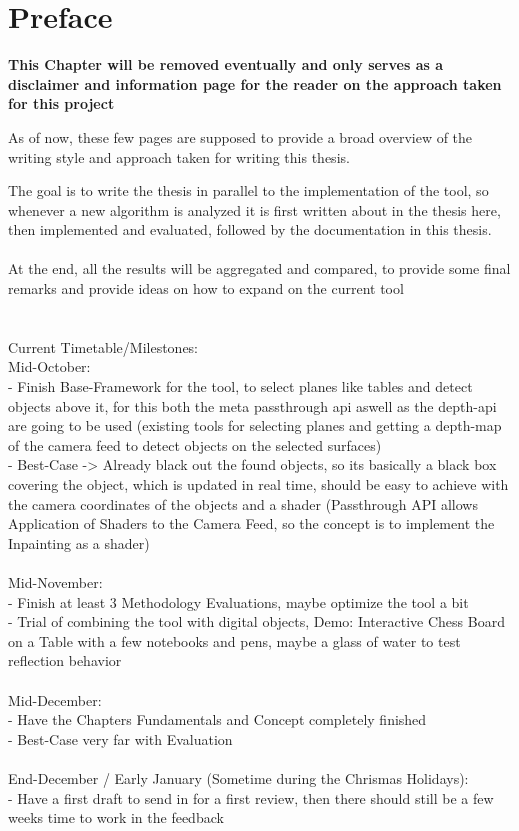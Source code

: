 \chapter{Preface}
\textbf{This Chapter will be removed eventually and only serves as a disclaimer and information page for the reader on the approach taken for this project}

As of now, these few pages are supposed to provide a broad overview of the writing style and approach taken for writing this thesis.

The goal is to write the thesis in parallel to the implementation of the tool, so whenever a new algorithm is analyzed it is first written about in the thesis here, then implemented and evaluated, followed by the documentation in this thesis.
\\\\
At the end, all the results will be aggregated and compared, to provide some final remarks and provide ideas on how to expand on the current tool
\\\\\\

Current Timetable/Milestones:\\
Mid-October:\\
-  Finish Base-Framework for the tool, to select planes like tables and detect objects above it, for this both the meta passthrough api aswell as the depth-api are going to be used (existing tools for selecting planes and getting a depth-map of the camera feed to detect objects on the selected surfaces)\\
- Best-Case -> Already black out the found objects, so its basically a black box covering the object, which is updated in real time, should be easy to achieve with the camera coordinates of the objects and a shader (Passthrough API allows Application of Shaders to the Camera Feed, so the concept is to implement the Inpainting as a shader)
\\\\
Mid-November: \\
- Finish at least 3 Methodology Evaluations, maybe optimize the tool a bit\\
- Trial of combining the tool with digital objects, Demo: Interactive Chess Board on a Table with a few notebooks and pens, maybe a glass of water to test reflection behavior
\\\\
Mid-December:\\
- Have the Chapters Fundamentals and Concept completely finished\\
- Best-Case very far with Evaluation
\\\\
End-December / Early January (Sometime during the Chrismas Holidays):\\
- Have a first draft to send in for a first review, then there should still be a few weeks time to work in the feedback



